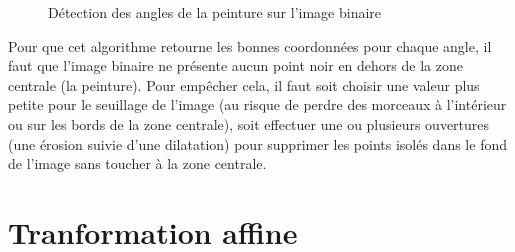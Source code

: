 \documentclass[a4paper]{article}
\begin{document}
        \begin{figure}[htbp]
            \begin{center}
                \caption{Détection des angles de la peinture sur l'image binaire}
                \label{fig:angle}
            \end{center}
        \end{figure}

        Pour que cet algorithme retourne les bonnes coordonnées pour chaque angle, il faut que l'image binaire ne présente aucun point noir en dehors de la zone centrale (la peinture). Pour empêcher cela, il faut soit choisir une valeur plus petite pour le seuillage de l'image (au risque de perdre des morceaux à l'intérieur ou sur les bords de la zone centrale), soit effectuer une ou plusieurs ouvertures (une érosion suivie d'une dilatation) pour supprimer les points isolés dans le fond de l'image sans toucher à la zone centrale.

    \section{Tranformation affine}
\end{document}
